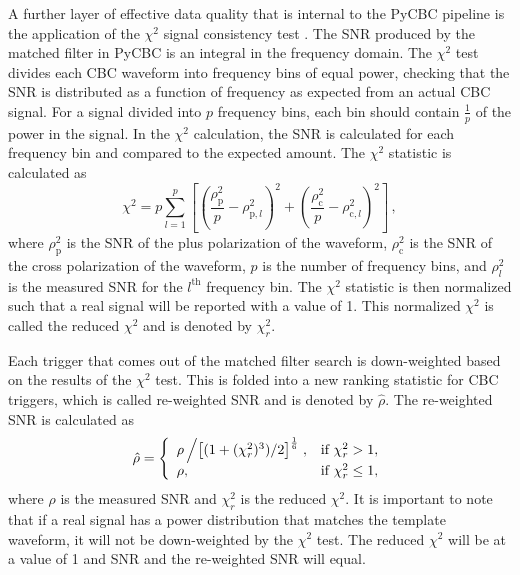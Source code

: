 A further layer of effective data quality that is internal to the PyCBC pipeline is the application of the
$\chi^{2}$ signal consistency test \cite{Allen:2004gu}. The SNR produced by the matched filter in PyCBC is an
integral in the frequency domain. The $\chi^{2}$ test divides each CBC waveform into
frequency bins of equal power, checking that the SNR is distributed as a function of frequency
as expected from an actual CBC signal.
For a signal divided into $p$ frequency bins, each bin should contain $\frac{1}{p}$ of the power in the 
signal. 
In the $\chi^2$ calculation, the SNR is calculated for each frequency bin and compared to the expected 
amount. The $\chi^2$ statistic is calculated as \cite{Usman:2015kfa}
\begin{equation}
\chi^2 = p\displaystyle\sum_{l=1}^{p}\left[\left(\frac{\rho_\mathrm{p}^2}{p}-\rho_{\mathrm{p},l}^2\right)^2 + \left(\frac{\rho^2_\mathrm{c}}{p}-\rho_{\mathrm{c},l}^2\right)^2 \right] \, ,
\label{eq:chisqr}
\end{equation}
where $\rho^2_\mathrm{p}$ is the SNR of the plus polarization of the waveform, $\rho^2_\mathrm{c}$ 
is the SNR of the cross 
polarization of the waveform, $p$ is the number of frequency bins, and $\rho^2_l$ is the measured SNR 
for the $l^\mathrm{th}$ frequency bin.
The $\chi^2$ statistic is then normalized such that a real signal will be reported with a value of 1. 
This normalized $\chi^2$ is called the reduced $\chi^2$ and is denoted by $\chi^2_r$.

Each trigger that comes out of the matched filter search is down-weighted based on the results of
the $\chi^{2}$ test. This is folded into a new ranking statistic for CBC triggers,
which is called re-weighted SNR and is denoted by $\hat{\rho}$.
The re-weighted SNR is calculated as \cite{Usman:2015kfa} 
\begin{equation}
\hat{\rho} = \left\{\begin{array}{lr}
\rho\left/\left[(1+(\chi^2_r)^3)/2\right]^\frac{1}{6}\right., & \text{if } \chi_r^2 > 1, \\
\rho, & \text{if } \chi_r^2 \le 1,
\label{eq:reweighted}
\end{array}\right.
\end{equation}
where $\rho$ is the measured SNR and $\chi^2_r$ is the reduced $\chi^2$.
It is important to note that if a real signal has a power
distribution that matches the template waveform, it will not be
down-weighted by the $\chi^{2}$ test. The reduced $\chi^2$ will be at a value of 1 
and SNR and the re-weighted SNR will equal.

